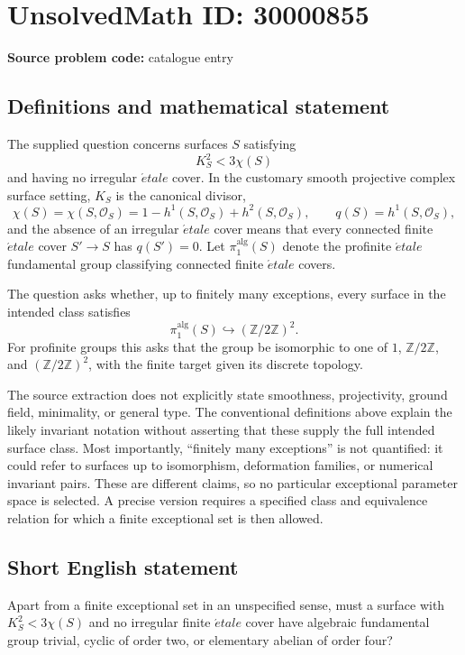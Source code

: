 \documentclass[11pt]{article}
\newcommand{\Z}{\mathbb{Z}}
\begin{document}
\section*{UnsolvedMath ID: 30000855}
\textbf{Source problem code:} catalogue entry
\subsection{Definitions and mathematical statement}
The supplied question concerns surfaces \(S\) satisfying
\[
K_S^2<3\chi(S)
\]
and having no irregular \(\acute{e}tale\) cover. In the customary smooth projective complex surface setting, \(K_S\) is the canonical divisor,
\[
\chi(S)=\chi(S,\mathcal O_S)=1-h^1(S,\mathcal O_S)+h^2(S,\mathcal O_S),
\qquad q(S)=h^1(S,\mathcal O_S),
\]
and the absence of an irregular \(\acute{e}tale\) cover means that every connected finite \(\acute{e}tale\) cover \(S'\to S\) has \(q(S')=0\). Let \(\pi_1^{\mathrm{alg}}(S)\) denote the profinite \(\acute{e}tale\) fundamental group classifying connected finite \(\acute{e}tale\) covers.

The question asks whether, up to finitely many exceptions, every surface in the intended class satisfies
\[
\pi_1^{\mathrm{alg}}(S)\hookrightarrow(\Z/2\Z)^2.
\]
For profinite groups this asks that the group be isomorphic to one of \(1\), \(\Z/2\Z\), and \((\Z/2\Z)^2\), with the finite target given its discrete topology.

The source extraction does not explicitly state smoothness, projectivity, ground field, minimality, or general type. The conventional definitions above explain the likely invariant notation without asserting that these supply the full intended surface class. Most importantly, ``finitely many exceptions'' is not quantified: it could refer to surfaces up to isomorphism, deformation families, or numerical invariant pairs. These are different claims, so no particular exceptional parameter space is selected. A precise version requires a specified class and equivalence relation for which a finite exceptional set is then allowed.
\subsection{Short English statement}
Apart from a finite exceptional set in an unspecified sense, must a surface with \(K_S^2<3\chi(S)\) and no irregular finite \(\acute{e}tale\) cover have algebraic fundamental group trivial, cyclic of order two, or elementary abelian of order four?
\end{document}
